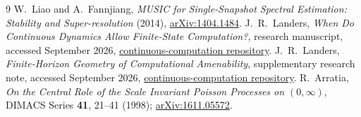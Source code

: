 \documentclass[10pt]{article}
\begin{document}
\begin{thebibliography}{9}
\setlength{\itemsep}{2pt}
W.~Liao and A.~Fannjiang, \emph{MUSIC for Single-Snapshot Spectral Estimation:
Stability and Super-resolution} (2014),
\href{https://arxiv.org/abs/1404.1484}{arXiv:1404.1484}.
J.~R.~Landers, \emph{When Do Continuous Dynamics Allow Finite-State Computation?},
research manuscript, accessed September 2026,
\href{https://github.com/jonland82/continuous-computation/blob/master/arxiv_paper_draft/continuous_computation.tex}{continuous-computation repository}.
J.~R.~Landers, \emph{Finite-Horizon Geometry of Computational Amenability},
supplementary research note, accessed September 2026,
\href{https://github.com/jonland82/continuous-computation/blob/master/supplemental_research_notes/finite-horizon-geometry-of-computational-amenability.md}{continuous-computation repository}.
R.~Arratia, \emph{On the Central Role of the Scale Invariant Poisson Processes
on $(0,\infty)$}, DIMACS Series \textbf{41}, 21--41 (1998);
\href{https://arxiv.org/abs/1611.05572}{arXiv:1611.05572}.
\end{thebibliography}
\end{document}
